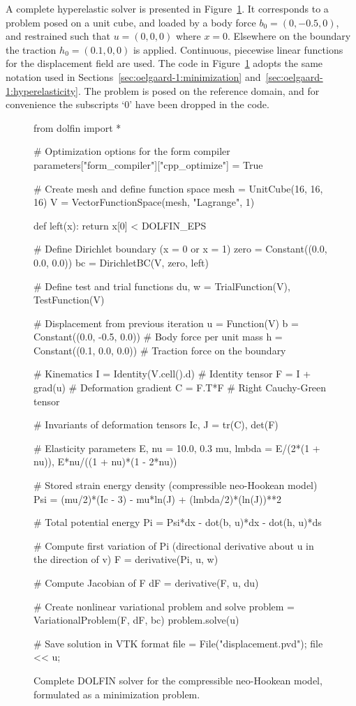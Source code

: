 A complete hyperelastic solver is presented
in Figure~\ref{fig:oelgaard-1:hyperelastic_solver_code}.
It corresponds to a problem posed on a unit cube, and loaded by
a body force $b_{0} = (0, -0.5, 0)$, and restrained such that $u =
(0, 0, 0)$ where $x = 0$. Elsewhere on the boundary the traction
$h_{0} = (0.1, 0, 0)$ is applied.  Continuous, piecewise linear
functions for the displacement field are used. The code in
Figure~\ref{fig:oelgaard-1:hyperelastic_solver_code} adopts the
same notation used in Sections~\ref{sec:oelgaard-1:minimization}
and~\ref{sec:oelgaard-1:hyperelasticity}. The problem is posed on the
reference domain, and for convenience the subscripts `$0$' have been
dropped in the code.

\begin{figure}
\begin{python}
from dolfin import *

# Optimization options for the form compiler
parameters["form_compiler"]["cpp_optimize"] = True

# Create mesh and define function space
mesh = UnitCube(16, 16, 16)
V = VectorFunctionSpace(mesh, "Lagrange", 1)

def left(x):
    return x[0] < DOLFIN_EPS

# Define Dirichlet boundary (x = 0 or x = 1)
zero = Constant((0.0, 0.0, 0.0))
bc = DirichletBC(V, zero, left)

# Define test and trial functions
du, w = TrialFunction(V), TestFunction(V)

# Displacement from previous iteration
u  = Function(V)
b  = Constant((0.0, -0.5, 0.0))  # Body force per unit mass
h  = Constant((0.1,  0.0, 0.0))  # Traction force on the boundary

# Kinematics
I = Identity(V.cell().d)    # Identity tensor
F = I + grad(u)             # Deformation gradient
C = F.T*F                   # Right Cauchy-Green tensor

# Invariants of deformation tensors
Ic, J = tr(C), det(F)

# Elasticity parameters
E, nu = 10.0, 0.3
mu, lmbda = E/(2*(1 + nu)), E*nu/((1 + nu)*(1 - 2*nu))

# Stored strain energy density (compressible neo-Hookean model)
Psi = (mu/2)*(Ic - 3) - mu*ln(J) + (lmbda/2)*(ln(J))**2

# Total potential energy
Pi = Psi*dx - dot(b, u)*dx - dot(h, u)*ds

# Compute first variation of Pi (directional derivative about u in the direction of v)
F = derivative(Pi, u, w)

# Compute Jacobian of F
dF = derivative(F, u, du)

# Create nonlinear variational problem and solve
problem = VariationalProblem(F, dF, bc)
problem.solve(u)

# Save solution in VTK format
file = File("displacement.pvd");
file << u;
\end{python}
\caption{Complete DOLFIN solver for the compressible neo-Hookean model,
formulated as a minimization problem.}
\label{fig:oelgaard-1:hyperelastic_solver_code}
\end{figure}

